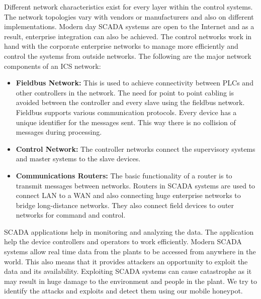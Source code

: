 \documentclass[article,msc=informatik,type=msc,colorback,accentcolor=tud9c]{tudthesis}
\begin{document}
	Different network characteristics exist for every layer within the control systems. The network topologies vary with vendors or manufacturers and also on different implementations. Modern day \ac{SCADA} systems are open to the Internet and as a result, enterprise integration can also be achieved. The control networks work in hand with the corporate enterprise networks to manage more efficiently and control the systems  from outside networks. The following are the major network components of an \ac{ICS} network:

	\begin{itemize}


	\item\textbf{Fieldbus Network:} This is used to achieve connectivity between \ac{PLC}s and other controllers in the network. The need for point to point cabling is avoided between the controller and every slave using the fieldbus network. Fieldbus supports various communication protocols. Every device has a unique identifier for the messages sent. This way there is no collision of messages during processing.
	
	
	\item\textbf{Control Network:} The controller networks connect the supervisory systems and master systems to the slave devices. 
		

	\item\textbf{Communications Routers:} The basic functionality of a router is to transmit messages between networks. Routers in \ac{SCADA} systems are used to connect \ac{LAN} to a \ac{WAN} and also connecting huge enterprise networks to bridge long-distance networks. They also connect field devices to outer networks for command and control. 
	
	 
	\end{itemize}

	\ac{SCADA} applications help in monitoring and analyzing the data. The application help the device controllers and operators to work efficiently. Modern \ac{SCADA} systems allow real time data from the plants to be accessed from anywhere in the world. This also means that it provides attackers an opportunity to exploit the data and its availability. Exploiting \ac{SCADA} systems can cause catastrophe as it may result in huge damage to the environment and people in the plant. We try to identify the attacks and exploits  and detect them using our mobile honeypot.
	
	\vspace{5mm} 
\end{document}
